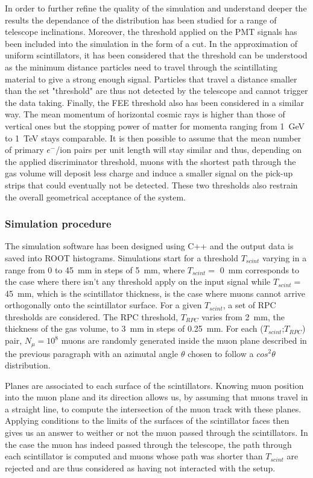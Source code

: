 			In order to further refine the quality of the simulation and understand deeper the results the dependance of the distribution has been studied for a range of telescope inclinations. Moreover, the threshold applied on the PMT signals has been included into the simulation in the form of a cut. In the approximation of uniform scintillators, it has been considered that the threshold can be understood as the minimum distance particles need to travel through the scintillating material to give a strong enough signal. Particles that travel a distance smaller than the set "threshold" are thus not detected by the telescope and cannot trigger the data taking. Finally, the FEE threshold also has been considered in a similar way. The mean momentum of horizontal cosmic rays is higher than those of vertical ones but the stopping power of matter for momenta ranging from \SI{1}{GeV} to \SI{1}{TeV} stays comparable. It is then possible to assume that the mean number of primary $e^-$/ion pairs per unit length will stay similar and thus, depending on the applied discriminator threshold, muons with the shortest path through the gas volume will deposit less charge and induce a smaller signal on the pick-up strips that could eventually not be detected. These two thresholds also restrain the overall geometrical acceptance of the system.
			
		\subsubsection{Simulation procedure}
		\label{sssec:SimProc}
		
			The simulation software has been designed using C++ and the output data is saved into ROOT histograms. Simulations start for a threshold $T_{scint}$ varying in a range from 0 to \SI{45}{mm} in steps of \SI{5}{mm}, where $T_{scint}=$ \SI{0}{mm} corresponds to the case where there isn't any threshold apply on the input signal while $T_{scint}=$ \SI{45}{mm}, which is the scintillator thickness, is the case where muons cannot arrive orthogonally onto the scintillator surface. For a given $T_{scint}$, a set of \acs{RPC} thresholds are considered. The RPC threshold, $T_{RPC}$ varies from \SI{2}{mm}, the thickness of the gas volume, to \SI{3}{mm} in steps of \SI{0.25}{mm}. For each ($T_{scint}$;$T_{RPC}$) pair, $N_{\mu}=10^8$ muons are randomly generated inside the muon plane described in the previous paragraph with an azimutal angle $\theta$ chosen to follow a $cos^2\theta$ distribution. 
			
			Planes are associated to each surface of the scintillators. Knowing muon position into the muon plane and its direction allows us, by assuming that muons travel in a straight line, to compute the intersection of the muon track with these planes. Applying conditions to the limits of the surfaces of the scintillator faces then gives us an answer to weither or not the muon passed through the scintillators. In the case the muon has indeed passed through the telescope, the path through each scintillator is computed and muons whose path was shorter than $T_{scint}$ are rejected and are thus considered as having not interacted with the setup.
			
